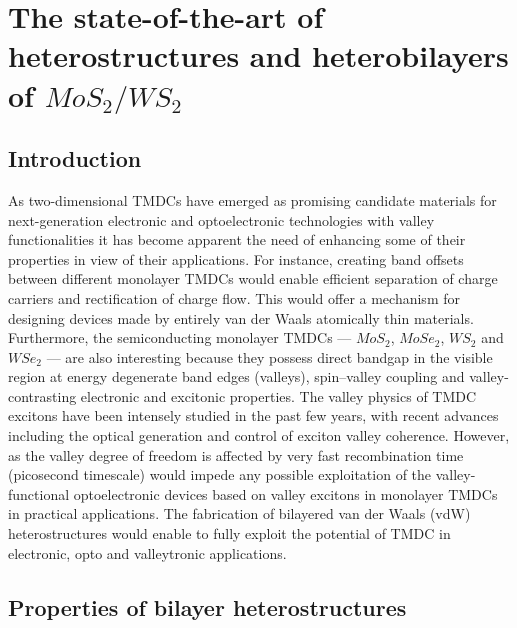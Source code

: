 \chapter{The state-of-the-art of heterostructures and heterobilayers of $MoS_2/WS_2$}

\section{Introduction}

As two-dimensional TMDCs have emerged as promising candidate materials for next-generation electronic and optoelectronic technologies with valley functionalities it has become apparent the need of enhancing some of their properties in view of their applications. For instance, creating band offsets between different monolayer TMDCs would enable efficient separation of charge carriers and rectification of charge flow. This would offer a mechanism for designing devices made by entirely van der Waals atomically thin materials.  Furthermore, the semiconducting monolayer TMDCs — $MoS_2$, $MoSe_2$, $WS_2$ and $WSe_2$ — are also interesting because they possess direct bandgap in the visible region at energy degenerate band edges (valleys), spin–valley coupling and valley-contrasting electronic and excitonic properties.
 The valley physics of TMDC excitons have been intensely studied in the past few years, with recent advances including the optical generation and control of exciton valley coherence. However, as the valley degree of freedom is affected by very fast recombination time (picosecond timescale) would impede any possible exploitation of the valley-functional optoelectronic devices based on valley excitons in monolayer TMDCs in practical applications. The fabrication of bilayered van der Waals (vdW) heterostructures would enable to fully exploit the potential of TMDC in electronic, opto and valleytronic applications.

\section{Properties of bilayer heterostructures}

